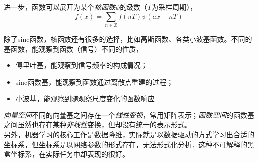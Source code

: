 	进一步，函数可以展开为某个\textit{核函数}$\psi$的级数（$T$为采样周期），
	$$
		f(x) = \sum_{n\in \mathbb{Z}}f(nT)\psi(ax-nT) 
	$$	

	除了sinc函数，核函数还有很多的选择，比如高斯函数、各类小波基函数。不同的基函数，能观察到函数（信号）不同的性质，
	
	\begin{itemize}
		\item 傅里叶基，能观察到信号频率的构成情况；
		\item sinc函数基，能观察到函数通过离散点重建的过程；
		\item 小波基，能观察到随观察尺度变化的函数响应
	\end{itemize}

	\textit{向量空间}不同的向量基之间存在一个\textit{线性变换}，常用矩阵表示；\textit{函数空间}的函数基之间虽然也存在某种\textit{非线性}变换，但却没有统一的表示形式。\\

	另外，机器学习的核心工作是数据降维，实际就是以数据驱动的方式学习出合适的坐标系，但坐标系是以网络参数的形式存在，无法形式化分析，这种不可解释的黑盒坐标系，在实际任务中却表现的很好。
	




	





